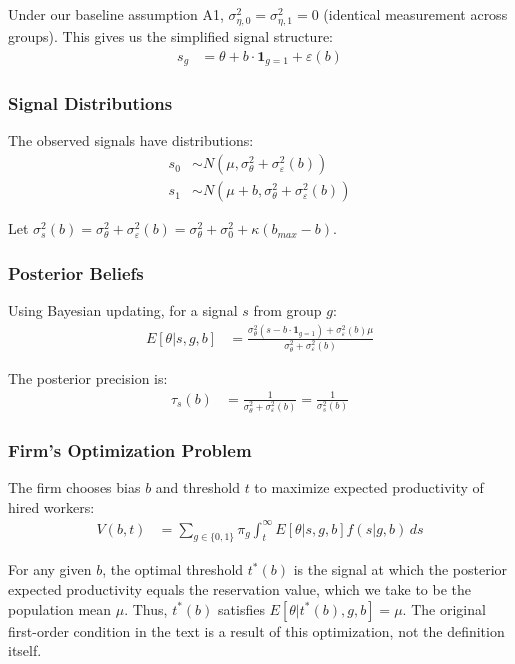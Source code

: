 \documentclass[12pt,a4paper]{article}
\theoremstyle{definition}
\theoremstyle{remark}
\begin{document}
Under our baseline assumption A1, $\sigma_{\eta,0}^2 = \sigma_{\eta,1}^2 = 0$ (identical measurement across groups). This gives us the simplified signal structure:
\begin{align}
s_g &= \theta + b \cdot \mathbf{1}_{g=1} + \varepsilon(b)
\end{align}

\subsubsection{Signal Distributions}
The observed signals have distributions:
\begin{align}
s_0 &\sim N(\mu, \sigma_\theta^2 + \sigma_\varepsilon^2(b)) \\
s_1 &\sim N(\mu + b, \sigma_\theta^2 + \sigma_\varepsilon^2(b))
\end{align}

Let $\sigma_s^2(b) = \sigma_\theta^2 + \sigma_\varepsilon^2(b) = \sigma_\theta^2 + \sigma_0^2 + \kappa(b_{max} - b)$.

\subsubsection{Posterior Beliefs}
Using Bayesian updating, for a signal $s$ from group $g$:
\begin{align}
E[\theta | s, g, b] &= \frac{\sigma_\theta^2 (s - b \cdot \mathbf{1}_{g=1}) + \sigma_\varepsilon^2(b) \mu}{\sigma_\theta^2 + \sigma_\varepsilon^2(b)} \label{eq:posterior}
\end{align}

The posterior precision is:
\begin{align}
\tau_s(b) &= \frac{1}{\sigma_\theta^2 + \sigma_\varepsilon^2(b)} = \frac{1}{\sigma_s^2(b)}
\end{align}

\subsubsection{Firm's Optimization Problem}
The firm chooses bias $b$ and threshold $t$ to maximize expected productivity of hired workers:
\begin{align}
V(b,t) &= \sum_{g \in \{0,1\}} \pi_g \int_t^\infty E[\theta | s, g, b] f(s|g,b) \, ds \label{eq:value_function}
\end{align}

For any given $b$, the optimal threshold $t^*(b)$ is the signal at which the posterior expected productivity equals the reservation value, which we take to be the population mean $\mu$. Thus, $t^*(b)$ satisfies $E[\theta | t^*(b), g, b] = \mu$. The original first-order condition in the text is a result of this optimization, not the definition itself.
\end{document}
